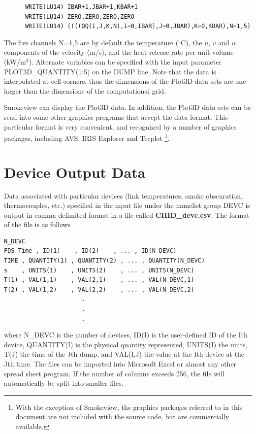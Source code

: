 \documentclass[11pt]{book}
\begin{document}
\footnotesize
\begin{verbatim}
      WRITE(LU14) IBAR+1,JBAR+1,KBAR+1
      WRITE(LU14) ZERO,ZERO,ZERO,ZERO
      WRITE(LU14) ((((QQ(I,J,K,N),I=0,IBAR),J=0,JBAR),K=0,KBAR),N=1,5)
\end{verbatim}
\normalsize
The five channels {\ct N=1,5} are by default the temperature
($^\circ$C), the $u$, $v$ and
$w$ components of the velocity (m/s), and the heat release rate
per unit volume (kW/m$^3$). Alternate variables can be specified with
the input parameter {\ct PLOT3D\_QUANTITY(1:5)} on the {\ct DUMP} line.
Note that the data is interpolated at
cell corners, thus the dimensions of the Plot3D data sets are
one larger than the dimensions of the computational grid.

Smokeview can display the Plot3D data. In
addition, the Plot3D data sets can be read into some other graphics
programs that accept the data format.
This particular format is very convenient, and recognized by
a number of graphics packages, including AVS, IRIS Explorer
and Tecplot
\footnote{With the exception of Smokeview,
the graphics packages referred to in this document are
not included with the source code, but are commercially available.}.

\section{Device Output Data}
\label{out:DEVC}

Data associated with particular devices (link temperatures, smoke obscuration, thermocouples, etc.)
specified in the input file under the namelist
group {\ct DEVC} is output in comma delimited format in a file called
{\bf CHID\_devc.csv}. The format of the file is as follows

\footnotesize
\begin{verbatim}
N_DEVC
FDS Time , ID(1)    , ID(2)    , ... , ID(N_DEVC)
TIME , QUANTITY(1) , QUANTITY(2) , ... , QUANTITY(N_DEVC)
s    , UNITS(1)    , UNITS(2)    , ... , UNITS(N_DEVC)
T(1) , VAL(1,1)    , VAL(2,1)    , ... , VAL(N_DEVC,1)
T(2) , VAL(1,2)    , VAL(2,2)    , ... , VAL(N_DEVC,2)
                      .
                      .
                      .
\end{verbatim}
\normalsize
where {\ct N\_DEVC} is the number of devices, {\ct ID(I)} is the user-defined
ID of the {\ct I}th device, {\ct QUANTITY(I)} is the physical quantity represented, {\ct UNITS(I)} the
units, {\ct T(J)} the time of the {\ct J}th dump, and
{\ct VAL(I,J)} the value at the {\ct I}th device at the {\ct J}th time.
The files can be imported into Microsoft Excel or almost any other
spread sheet program. If the number of columns exceeds 256, the file will automatically be split into smaller files.
\end{document}
